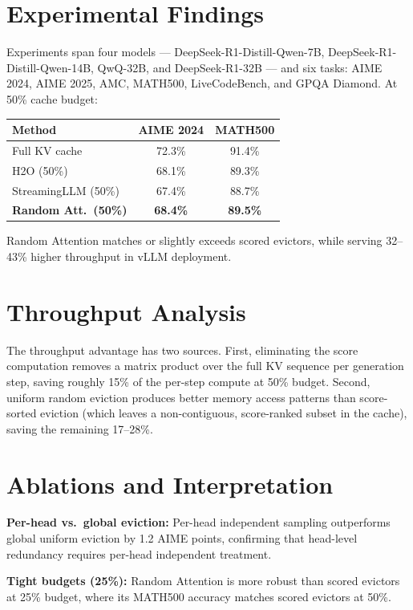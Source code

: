 \documentclass[10pt,twocolumn]{article}
\begin{document}
\section{Experimental Findings}

Experiments span four models --- DeepSeek-R1-Distill-Qwen-7B,
DeepSeek-R1-Distill-Qwen-14B, QwQ-32B, and DeepSeek-R1-32B --- and
six tasks: AIME 2024, AIME 2025, AMC, MATH500, LiveCodeBench, and GPQA
Diamond. At 50\% cache budget:

\begin{center}
\begin{tabular}{lcc}
\toprule
Method & AIME 2024 & MATH500 \\
\midrule
Full KV cache           & 72.3\% & 91.4\% \\
H2O (50\%)              & 68.1\% & 89.3\% \\
StreamingLLM (50\%)     & 67.4\% & 88.7\% \\
\textbf{Random Att.\ (50\%)} & \textbf{68.4\%} & \textbf{89.5\%} \\
\bottomrule
\end{tabular}
\end{center}

Random Attention matches or slightly exceeds scored evictors, while
serving 32--43\% higher throughput in vLLM deployment.

\section{Throughput Analysis}

The throughput advantage has two sources. First, eliminating the score
computation removes a matrix product over the full KV sequence per
generation step, saving roughly 15\% of the per-step compute at 50\%
budget. Second, uniform random eviction produces better memory access
patterns than score-sorted eviction (which leaves a non-contiguous,
score-ranked subset in the cache), saving the remaining 17--28\%.

\section{Ablations and Interpretation}

\textbf{Per-head vs.\ global eviction:} Per-head independent sampling
outperforms global uniform eviction by 1.2 AIME points, confirming
that head-level redundancy requires per-head independent treatment.

\textbf{Tight budgets (25\%):} Random Attention is more robust than
scored evictors at 25\% budget, where its MATH500 accuracy matches
scored evictors at 50\%.
\end{document}
